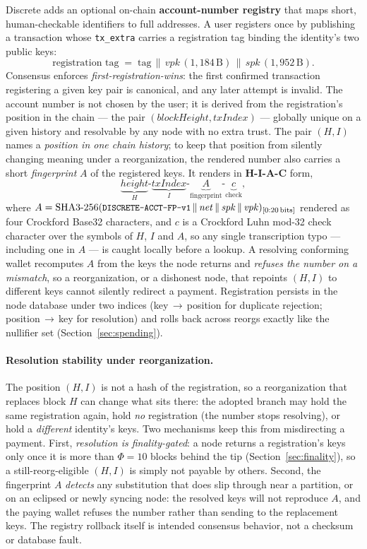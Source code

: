 \documentclass[11pt,a4paper]{article}
\newcommand{\code}[1]{\texttt{\small #1}}
\newcommand{\concat}{\,\|\,}
\begin{document}
Discrete adds an optional on-chain \textbf{account-number registry} that maps
short, human-checkable identifiers to full addresses. A user registers once by
publishing a transaction whose \code{tx\_extra} carries a registration tag
binding the identity's two public keys:
\[
\text{registration tag} \;=\; \mathrm{tag} \concat \mathit{vpk}\,(1{,}184\,\mathrm{B}) \concat \mathit{spk}\,(1{,}952\,\mathrm{B}).
\]
Consensus enforces \emph{first-registration-wins}: the first confirmed
transaction registering a given key pair is canonical, and any later attempt
is invalid. The account number is not chosen by the user; it is derived from
the registration's position in the chain --- the pair
$(\mathit{blockHeight}, \mathit{txIndex})$ --- globally unique on a given
history and resolvable by any node with no extra trust. The pair $(H,I)$ names a
\emph{position in one chain history}; to keep that position from silently
changing meaning under a reorganization, the rendered number also carries a short
\emph{fingerprint} $A$ of the registered keys. It renders in
\textbf{H-I-A-C} form,
\[
\underbrace{\mathit{height}}_{H} \text{-} \underbrace{\mathit{txIndex}}_{I}
\text{-} \underbrace{A}_{\mathrm{fingerprint}}
\text{-} \underbrace{c}_{\mathrm{check}},
\]
where $A = \mathrm{SHA3\text{-}256}(\text{\code{DISCRETE-ACCT-FP-v1}} \concat
\mathit{net} \concat \mathit{spk} \concat \mathit{vpk})_{[0{:}20\,\mathrm{bits}]}$
rendered as four Crockford Base32 characters, and $c$ is a Crockford Luhn mod-32
check character over the symbols of $H$, $I$ and $A$, so any single transcription
typo --- including one in $A$ --- is caught locally before a lookup. A resolving
conforming wallet recomputes $A$ from the keys the node returns and \emph{refuses the number
on a mismatch}, so a reorganization, or a dishonest node, that repoints $(H,I)$
to different keys cannot silently redirect a payment. Registration persists in
the node database under two
indices (key\,$\to$\,position for duplicate rejection;
position\,$\to$\,key for resolution) and rolls back across reorgs exactly
like the nullifier set (Section~\ref{sec:spending}).

\paragraph{Resolution stability under reorganization.}
The position $(H,I)$ is not a hash of the registration, so a reorganization that
replaces block $H$ can change what sits there: the adopted branch may hold the
same registration again, hold \emph{no} registration (the number stops
resolving), or hold a \emph{different} identity's keys. Two mechanisms keep this
from misdirecting a payment. First, \emph{resolution is finality-gated}: a node
returns a registration's keys only once it is more than $\Phi=10$ blocks behind
the tip (Section~\ref{sec:finality}), so a still-reorg-eligible $(H,I)$ is simply
not payable by others. Second, the fingerprint $A$ \emph{detects} any substitution
that does slip through near a partition, or on an eclipsed or newly syncing node:
the resolved keys will not reproduce $A$, and the paying wallet refuses the number
rather than sending to the replacement keys. The registry rollback itself is
intended consensus behavior, not a checksum or database fault.
\end{document}
